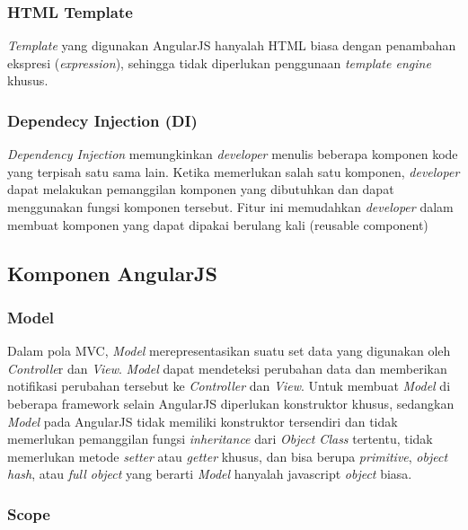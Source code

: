 \subsubsection{HTML Template}
\label{subsub: HTMLTemplate}

	\textit{Template} yang digunakan AngularJS hanyalah HTML biasa dengan penambahan ekspresi (\textit{expression}), sehingga tidak diperlukan penggunaan \textit{template engine} khusus.

\subsubsection{Dependecy Injection (DI)}
\label{subsub: DI}

	\textit{Dependency Injection} memungkinkan \textit{developer} menulis beberapa komponen kode yang terpisah satu sama lain. Ketika memerlukan salah satu komponen, \textit{developer} dapat melakukan pemanggilan komponen yang dibutuhkan dan dapat menggunakan fungsi komponen tersebut. Fitur ini memudahkan \textit{developer} dalam membuat komponen yang dapat dipakai berulang kali (reusable component)

\subsection{Komponen AngularJS}
\label{sub: komponenAngularJS}
	


\subsubsection{Model}
\label{subsub: model}

	Dalam pola MVC, \textit{Model} merepresentasikan suatu set data yang digunakan oleh \textit{Controlle}r dan \textit{View}. \textit{Model} dapat mendeteksi perubahan data dan memberikan notifikasi perubahan tersebut ke \textit{Controller} dan \textit{View}. Untuk membuat \textit{Model} di beberapa framework selain AngularJS diperlukan konstruktor khusus, sedangkan \textit{Model} pada AngularJS tidak memiliki konstruktor tersendiri dan tidak memerlukan pemanggilan fungsi \textit{inheritance} dari \textit{Object Class} tertentu, tidak memerlukan metode \textit{setter} atau \textit{getter} khusus, dan bisa berupa \textit{primitive}, \textit{object hash}, atau \textit{full object} yang berarti \textit{Model} hanyalah javascript \textit{object} biasa.

\subsubsection{Scope}
\label{sub: Scope}

